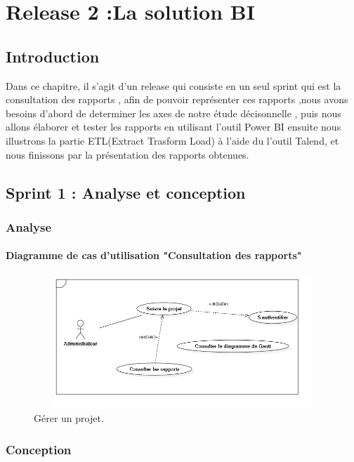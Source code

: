 \chapter{Release 2 :La solution BI }


\section{Introduction}

Dans ce chapitre, il s'agit d'un release qui consiste en un seul sprint qui est la consultation des rapports ,
afin de pouvoir repr\'{e}senter ces rapports ,nous avons besoins d'abord de determiner
les axes de notre \'{e}tude d\'{e}cisonnelle , puis nous allons \'{e}laborer et tester les rapports en utilisant l'outil Power BI
ensuite nous illustrons la partie ETL(Extract Trasform Load) \`{a} l'aide du l'outil Talend,
et nous finissons par la pr\'{e}sentation des rapports obtenues.

\section{ Sprint 1 : Analyse et conception}
\subsection{Analyse}

\subsubsection{ Diagramme de cas d'utilisation "Consultation des rapports"}
\begin{figure}[H]
\center
\includegraphics[width=12cm,height=5cm]{./figures/ucS.png}
\caption{G\'{e}rer un projet.}

\end{figure}

\subsection{Conception}


